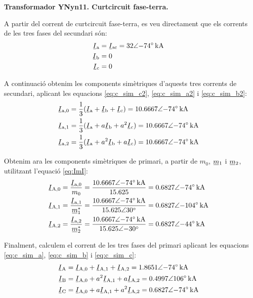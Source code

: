 \begin{exemple}[\CCasimSecTrafo{}]
    \textbf{ Transformador YNyn11. Curtcircuit fase-terra.}

    \begin{center}
       
    \end{center}

    A partir del corrent de curtcircuit fase-terra, es veu directament que els corrents de les tres fases del secundari són:
    \begin{align*}
        \cmplx{I}\ped{a} &= \cmplx{I}\ped{sc} = \complexqty{32:-74}{kA} \\
        \cmplx{I}\ped{b} &= 0  \\
        \cmplx{I}\ped{c} &= 0
    \end{align*}

    A continuació obtenim les components simètriques d'aquests tres corrents de secundari, aplicant les equacions \eqref{eq:c_sim_c2}, \eqref{eq:c_sim_a2} i \eqref{eq:c_sim_b2}:
    \begin{align*}
        \cmplx{I}\ped{a,0} &= \frac{1}{3} (\cmplx{I}\ped{a} + \cmplx{I}\ped{b} +
        \cmplx{I}\ped{c}) = \complexqty{10,6667:-74}{kA} \\
        \cmplx{I}\ped{a,1} &= \frac{1}{3} (\cmplx{I}\ped{a} + a \cmplx{I}\ped{b} +
         a^2 \cmplx{I}\ped{c}) = \complexqty{10,6667:-74}{kA}  \\
        \cmplx{I}\ped{a,2} &= \frac{1}{3} (\cmplx{I}\ped{a} + a^2 \cmplx{I}\ped{b} +
         a \cmplx{I}\ped{c}) = \complexqty{10,6667:-74}{kA}
    \end{align*}

    Obtenim ara les components simètriques de primari, a partir de $m_0$, $\cmplx{m}_1$ i $\cmplx{m}_2$, utilitzant l'equació \eqref{eq:ImI}:
    \begin{align*}
        \cmplx{I}\ped{A,0} &= \frac{\cmplx{I}\ped{a,0}}{m_0} = \frac{\complexqty{10,6667:-74}{kA}}{\num{15,625}} =  \complexqty{0,6827:-74}{kA}\\
        \cmplx{I}\ped{A,1} &= \frac{\cmplx{I}\ped{a,1}}{\cmplx{m}^*_1} = \frac{\complexqty{10,6667:-74}{kA}}{\complexnum{15,625:30}} =  \complexqty{0,6827:-104}{kA} \\
        \cmplx{I}\ped{A,2} &= \frac{\cmplx{I}\ped{a,2}}{\cmplx{m}^*_2} = \frac{\complexqty{10,6667:-74}{kA}}{\complexnum{15,625:-30}} = \complexqty{0,6827:-44}{kA}
    \end{align*}

    Finalment, calculem el corrent de les tres fases del primari aplicant les equacions \eqref{eq:c_sim_a}, \eqref{eq:c_sim_b} i \eqref{eq:c_sim_c}:
     \begin{align*}
        \cmplx{I}\ped{A} &= \cmplx{I}\ped{A,0} + \cmplx{I}\ped{A,1} + \cmplx{I}\ped{A,2} = \complexqty{1,8651:-74}{kA} \\
        \cmplx{I}\ped{B} &= \cmplx{I}\ped{A,0} + a^2 \cmplx{I}\ped{A,1} + a \cmplx{I}\ped{A,2} = \complexqty{0,4997:106}{kA} \\
        \cmplx{I}\ped{C} &= \cmplx{I}\ped{A,0} + a \cmplx{I}\ped{A,1} + a^2 \cmplx{I}\ped{A,2} = \complexqty{0,6827:-74}{kA}
    \end{align*}


\end{exemple}

